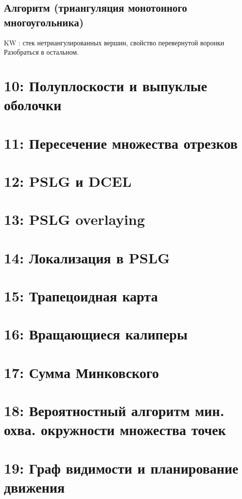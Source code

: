\documentclass[11pt]{article}
\begin{document}
\subsection{Алгоритм (триангуляция монотонного многоугольника)}
\label{sec-11-6}
KW : стек нетриангулированных вершин, свойство перевернутой воронки
Разобраться в остальном.
\section{{\bfseries{}} 10: Полуплоскости и выпуклые оболочки}
\label{sec-12}
\section{{\bfseries{}} 11: Пересечение множества отрезков}
\label{sec-13}
\section{{\bfseries{}} 12: PSLG и DCEL}
\label{sec-14}
\section{{\bfseries{}} 13: PSLG overlaying}
\label{sec-15}
\section{{\bfseries{}} 14: Локализация в PSLG}
\label{sec-16}
\section{{\bfseries{}} 15: Трапецоидная карта}
\label{sec-17}
\section{{\bfseries{}} 16: Вращающиеся калиперы}
\label{sec-18}
\section{{\bfseries{}} 17: Сумма Минковского}
\label{sec-19}
\section{{\bfseries{}} 18: Вероятностный алгоритм мин. охва. окружности множества точек}
\label{sec-20}
\section{{\bfseries{}} 19: Граф видимости и планирование движения}
\label{sec-21}
\end{document}
